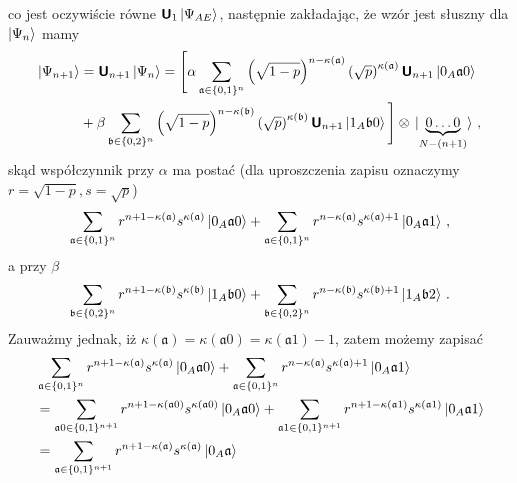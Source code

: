\documentclass{myclass}
\begin{document}
co jest oczywiście równe \(\boldsymbol{\mathsf{U}}_1\ket{\Psi_{AE}}\), następnie zakładając, że wzór jest słuszny
dla \(\ket{\Psi_n}\) mamy
\begin{equation*}
    \begin{split}
        \ket{\Psi_{n+1}} &= \boldsymbol{\mathsf{U}}_{n+1}\ket{\Psi_n} = \Bigg[\alpha\sum_{\mathfrak{a}\in\{0,1\}^n}\left(\sqrt{1-p}\right)^{n-\kappa(\mathfrak{a})}\left(\sqrt{p}\right)^{\kappa(\mathfrak{a})}\boldsymbol{\mathsf{U}}_{n+1}\ket{0_A\mathfrak{a}0} \\
        &+ \beta\sum_{\mathfrak{b}\in\{0,2\}^n}\left(\sqrt{1-p}\right)^{n-\kappa(\mathfrak{b})}\left(\sqrt{p}\right)^{\kappa(\mathfrak{b})}\boldsymbol{\mathsf{U}}_{n+1}\ket{1_A\mathfrak{b}0} \Bigg] \otimes \ket*{\underbrace{0\ldots 0}_{N-(n+1)}}\,,
    \end{split}
\end{equation*}
skąd współczynnik przy \(\alpha\) ma postać (dla uproszczenia zapisu oznaczymy \(r=\sqrt{1-p},
s=\sqrt{p}\))
\begin{equation*}
    \begin{split}
        \sum_{\mathfrak{a}\in\{0,1\}^n}r^{n+1-\kappa(\mathfrak{a})}s^{\kappa(\mathfrak{a})}\ket{0_A\mathfrak{a}0} + \sum_{\mathfrak{a}\in\{0,1\}^n}r^{n-\kappa(\mathfrak{a})}s^{\kappa(\mathfrak{a}) + 1}\ket{0_A\mathfrak{a}1}\,,
    \end{split}
\end{equation*}
a przy \(\beta\)
\begin{equation*}
    \begin{split}
        \sum_{\mathfrak{b}\in\{0,2\}^n}r^{n+1-\kappa(\mathfrak{b})}s^{\kappa(\mathfrak{b})}\ket{1_A\mathfrak{b}0} + \sum_{\mathfrak{b}\in\{0,2\}^n}r^{n-\kappa(\mathfrak{b})}s^{\kappa(\mathfrak{b}) + 1}\ket{1_A\mathfrak{b}2}\,.
    \end{split}
\end{equation*}
Zauważmy jednak, iż \(\kappa(\mathfrak{a}) = \kappa(\mathfrak{a}0) = \kappa(\mathfrak{a}1) - 1\),
zatem możemy zapisać
\begin{equation*}
    \begin{split}
        &\sum_{\mathfrak{a}\in\{0,1\}^n}r^{n+1-\kappa(\mathfrak{a})}s^{\kappa(\mathfrak{a})}\ket{0_A\mathfrak{a}0} + \sum_{\mathfrak{a}\in\{0,1\}^n}r^{n-\kappa(\mathfrak{a})}s^{\kappa(\mathfrak{a}) + 1}\ket{0_A\mathfrak{a}1} \\
        &=\sum_{\mathfrak{a}0\in\{0,1\}^{n+1}}r^{n+1-\kappa(\mathfrak{a}0)}s^{\kappa(\mathfrak{a}0)}\ket{0_A\mathfrak{a}0} + \sum_{\mathfrak{a}1\in\{0,1\}^{n+1}}r^{n + 1-\kappa(\mathfrak{a}1)}s^{\kappa(\mathfrak{a}1)}\ket{0_A\mathfrak{a}1} \\
        &=\sum_{\mathfrak{a} \in \{0,1\}^{n+1}}r^{n+1-\kappa(\mathfrak{a})}s^{\kappa(\mathfrak{a})}\ket{0_A\mathfrak{a}}
    \end{split}
\end{equation*}
\end{document}
